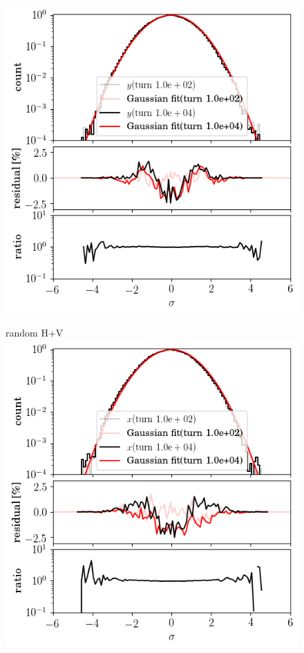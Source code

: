 \documentclass[%
 reprint,
 amsmath,amssymb,
 aps,
prstab,
]{revtex4-1}
\begin{document}
\begin{figure}[t]
\begin{minipage}[t]{0.49\linewidth}
		\includegraphics[width=1.0\linewidth]{2016injerra2b2u_t10skhv_3_5um_hist_y.png}
	\end{minipage}	
	\begin{minipage}[t]{0.49\linewidth}
		\centering
		random H+V
		\includegraphics[width=1.0\linewidth]{2016injerra2b2u_ranhv_3_5um_hist_x.png}

\end{minipage}
\end{figure}
\end{document}
